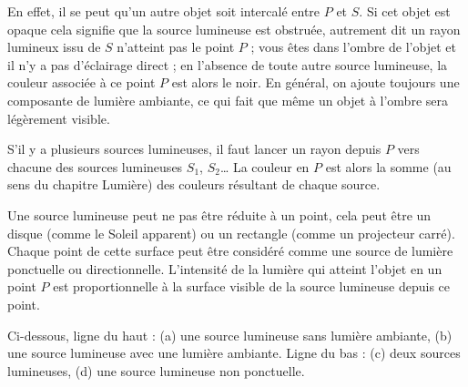 \documentclass[11pt,class=report,crop=false]{standalone}
\begin{document}

 En effet, il se peut qu'un autre objet soit intercalé entre $P$ et $S$. Si cet objet est opaque cela signifie que la source lumineuse est obstruée, autrement dit un rayon lumineux issu de $S$ n'atteint pas le point $P$ ; vous êtes dans l'ombre de l'objet et il n'y a pas d'éclairage direct ; en l'absence de toute autre source lumineuse, la couleur associée à ce point $P$ est alors le noir.
En général, on ajoute toujours une composante de lumière ambiante, ce qui fait que même un objet à l'ombre sera légèrement visible.




S'il y a plusieurs sources lumineuses, il faut lancer un rayon depuis $P$ vers chacune des sources lumineuses $S_1$, $S_2$\ldots{} 
La couleur en $P$ est alors la somme (au sens du chapitre \og{}Lumière\fg{}) des couleurs résultant de chaque source.



Une source lumineuse peut ne pas être réduite à un point, cela peut être un disque (comme le Soleil apparent) ou un rectangle (comme un projecteur carré). Chaque point de cette surface peut être considéré comme une source de lumière ponctuelle ou directionnelle.
L'intensité de la lumière qui atteint l'objet en un point $P$ est proportionnelle à la surface visible de la source lumineuse depuis ce point.



Ci-dessous, ligne du haut : (a) une source lumineuse sans lumière ambiante, (b) une source lumineuse avec une lumière ambiante.
Ligne du bas : (c) deux sources lumineuses, (d) une source lumineuse non ponctuelle.
\end{document}
